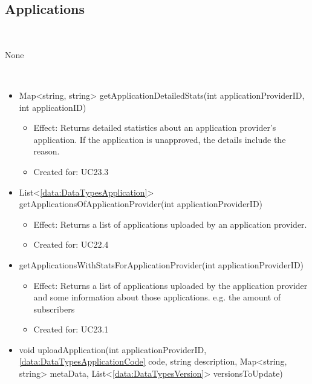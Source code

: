   \subsection{Applications}\label{int:OnlineServiceOnlineServiceApplicationProviderFacadeApplications}
    \begin{description}
      \item[Provided by:] \iconcomponent{}~
      \item[Required by:] None
      \item[Operations:] ~
    \begin{itemize}[noitemsep,nolistsep,leftmargin=-.25cm]
      \item \textsf{Map\textless{}string, string\textgreater{} getApplicationDetailedStats(int applicationProviderID, int applicationID)}
        \begin{itemize}[noitemsep,nolistsep]
           \item Effect: Returns detailed statistics about an application provider's application. If the application is unapproved, the details include the reason.
\item Created for: UC23.3
        \end{itemize}
      \item \textsf{List\textless{}\ref{data:DataTypesApplication}\textgreater{} getApplicationsOfApplicationProvider(int applicationProviderID)}
        \begin{itemize}[noitemsep,nolistsep]
           \item Effect: Returns a list of applications uploaded by an application provider.
\item Created for: UC22.4
        \end{itemize}
      \item \textsf{ getApplicationsWithStatsForApplicationProvider(int applicationProviderID)}
        \begin{itemize}[noitemsep,nolistsep]
           \item Effect: Returns a list of applications uploaded by the application provider and some information about those applications. e.g. the amount of subscribers
\item Created for: UC23.1
        \end{itemize}
      \item \textsf{void uploadApplication(int applicationProviderID, \ref{data:DataTypesApplicationCode} code, string description, Map\textless{}string, string\textgreater{} metaData, List\textless{}\ref{data:DataTypesVersion}\textgreater{} versionsToUpdate)}

\end{itemize}
\end{description}
